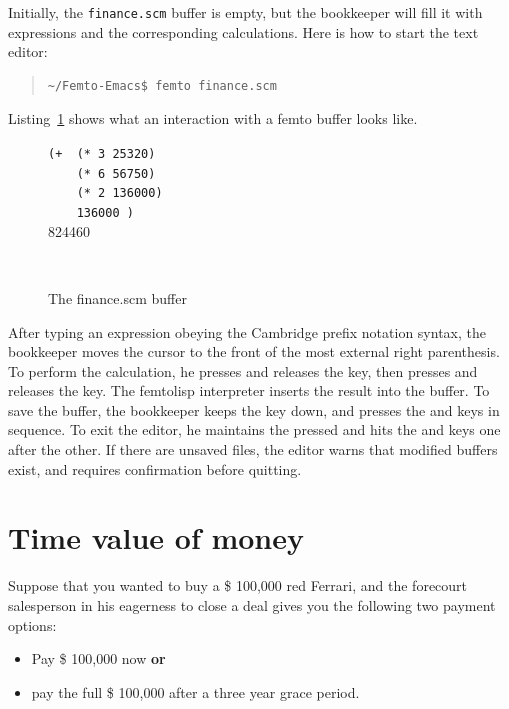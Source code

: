\documentclass[a4paper,12pt]{book}
\newenvironment{fmpage}[1]
           {\begin{lrbox}{\fmbox}\begin{minipage}{#1}}
           {\end{minipage}\end{lrbox}\fbox{\usebox{\fmbox}}}
\begin{document}
Initially, the \verb|finance.scm| buffer
is empty, but the bookkeeper will fill it
with expressions and the corresponding
calculations. Here is how to start the
text editor:
\begin{quote}
\begin{verbatim}
~/Femto-Emacs$ femto finance.scm
\end{verbatim}
\end{quote}
Listing~\ref{texan:photos} shows what
an interaction with a femto buffer looks like.

\begin{figure}[!h]
\begin{fmpage}{0.8\textwidth}

\verb|(+  (* 3 25320)|\\
\verb|    (* 6 56750)|\\
\verb|    (* 2 136000)|\\
\verb|    136000 )|\keys{~]~}\\ 
824460
\end{fmpage}

\begin{fmpage}{0.8\textwidth}
\verb| |
\end{fmpage}
\caption{The finance.scm buffer}
\label{texan:photos}
\end{figure}

After typing an expression obeying the
Cambridge prefix notation syntax,
the bookkeeper moves the cursor to the front
of the most external right parenthesis.
To perform the calculation,
he presses and releases the
 key, then presses and releases
the \keys{~]~} key. The femtolisp
interpreter inserts the result
into the buffer.
To save the buffer, the bookkeeper
keeps the  key down,
and presses the  and
 keys in sequence.
To exit the
editor, he maintains the 
pressed and hits the 
and  keys one after the other.
If there are
unsaved files, the editor warns
that modified buffers exist,
and requires confirmation before
quitting.

\section{Time value of money}
Suppose that you wanted to buy a \$ 100,000 red Ferrari,
and the forecourt salesperson in his eagerness to
close a deal gives you the following two payment options:  
\begin{itemize}
\item Pay \$ 100,000 now {\bf or}
\item pay the full \$ 100,000 after a three year grace period.
\end{itemize}
\end{document}
